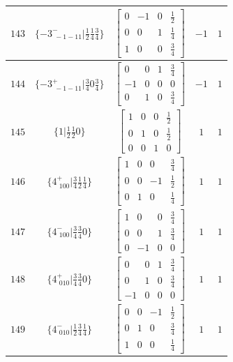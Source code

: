 \documentclass[fleqn,8pt]{jsarticle}
\begin{document}
\begin{longtable}{ccccc}
$ 143 $ & $ \{-3^{-}_{\,\,-1-11}|\frac{1}{2} \frac{1}{4} \frac{3}{4}\} $ & $ \begin{bmatrix} 0 & -1 & 0 & \frac{1}{2} \\ 0 & 0 & 1 & \frac{1}{4} \\ 1 & 0 & 0 & \frac{3}{4} \end{bmatrix} $ & $ -1 $ & $ 1 $ \\ \hline
$ 144 $ & $ \{-3^{+}_{\,\,-1-11}|\frac{3}{4} 0 \frac{3}{4}\} $ & $ \begin{bmatrix} 0 & 0 & 1 & \frac{3}{4} \\ -1 & 0 & 0 & 0 \\ 0 & 1 & 0 & \frac{3}{4} \end{bmatrix} $ & $ -1 $ & $ 1 $ \\ \hline
$ 145 $ & $ \{1|\frac{1}{2} \frac{1}{2} 0\} $ & $ \begin{bmatrix} 1 & 0 & 0 & \frac{1}{2} \\ 0 & 1 & 0 & \frac{1}{2} \\ 0 & 0 & 1 & 0 \end{bmatrix} $ & $ 1 $ & $ 1 $ \\ \hline
$ 146 $ & $ \{4^{+}_{\,\,100}|\frac{3}{4} \frac{1}{2} \frac{1}{4}\} $ & $ \begin{bmatrix} 1 & 0 & 0 & \frac{3}{4} \\ 0 & 0 & -1 & \frac{1}{2} \\ 0 & 1 & 0 & \frac{1}{4} \end{bmatrix} $ & $ 1 $ & $ 1 $ \\ \hline
$ 147 $ & $ \{4^{-}_{\,\,100}|\frac{3}{4} \frac{3}{4} 0\} $ & $ \begin{bmatrix} 1 & 0 & 0 & \frac{3}{4} \\ 0 & 0 & 1 & \frac{3}{4} \\ 0 & -1 & 0 & 0 \end{bmatrix} $ & $ 1 $ & $ 1 $ \\ \hline
$ 148 $ & $ \{4^{+}_{\,\,010}|\frac{3}{4} \frac{3}{4} 0\} $ & $ \begin{bmatrix} 0 & 0 & 1 & \frac{3}{4} \\ 0 & 1 & 0 & \frac{3}{4} \\ -1 & 0 & 0 & 0 \end{bmatrix} $ & $ 1 $ & $ 1 $ \\ \hline
$ 149 $ & $ \{4^{-}_{\,\,010}|\frac{1}{2} \frac{3}{4} \frac{1}{4}\} $ & $ \begin{bmatrix} 0 & 0 & -1 & \frac{1}{2} \\ 0 & 1 & 0 & \frac{3}{4} \\ 1 & 0 & 0 & \frac{1}{4} \end{bmatrix} $ & $ 1 $ & $ 1 $ \\ \hline

\end{longtable}
\end{document}
